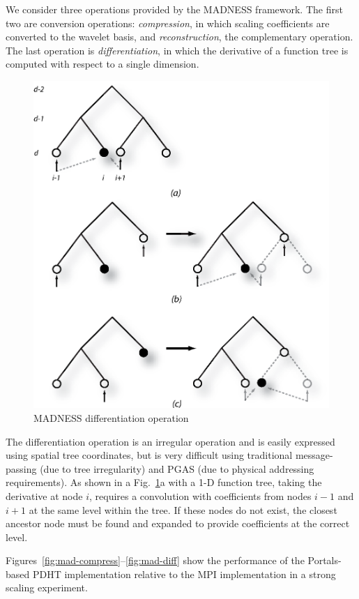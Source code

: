 We consider three operations provided by the MADNESS framework. The
first two are conversion operations: {\em compression}, in which scaling
coefficients are converted to the wavelet basis, and {\em reconstruction}, the
complementary operation. The last operation is {\em differentiation}, in which
the derivative of a function tree is computed with respect to a single
dimension. 

\begin{figure}
  \centering
  \includegraphics[width=.75\linewidth]{figs/diff}
  \caption{MADNESS differentiation operation}
  \label{fig:diff}
\end{figure}


The differentiation operation is an irregular operation and is easily expressed
using spatial tree coordinates, but is very difficult using traditional
message-passing (due to tree irregularity) and PGAS (due to physical addressing
requirements). As shown in a Fig.~\ref{fig:diff}a with a 1-D function tree,
taking the derivative at node $i$, requires a convolution with coefficients
from nodes $i-1$ and $i+1$ at the same level within the tree. If these nodes
do not exist, the closest ancestor node must be found and expanded to provide
coefficients at the correct level. 


Figures~\ref{fig:mad-compress}--\ref{fig:mad-diff} show the performance of the
Portals-based PDHT implementation relative to the MPI implementation in a strong
scaling experiment.

